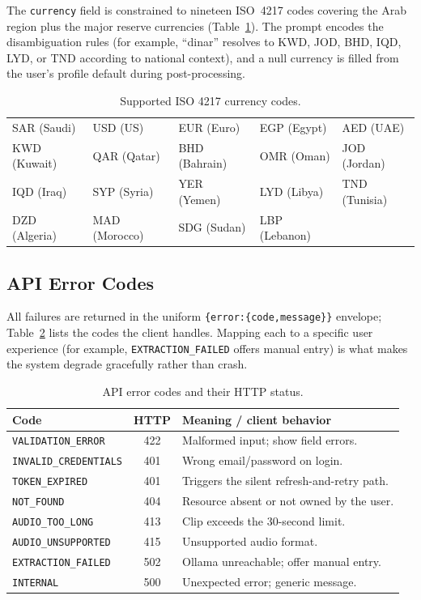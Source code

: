 The \texttt{currency} field is constrained to nineteen ISO~4217 codes covering the
Arab region plus the major reserve currencies (Table~\ref{tab:currencies}). The
prompt encodes the disambiguation rules (for example, ``dinar'' resolves to KWD,
JOD, BHD, IQD, LYD, or TND according to national context), and a null currency is
filled from the user's profile default during post-processing.

\begin{table}[H]
\centering
\caption{Supported ISO 4217 currency codes.}
\label{tab:currencies}
\small
\renewcommand{\arraystretch}{1.15}
\begin{tabularx}{\textwidth}{X X X X X}
\toprule
SAR (Saudi) & USD (US) & EUR (Euro) & EGP (Egypt) & AED (UAE) \\
KWD (Kuwait) & QAR (Qatar) & BHD (Bahrain) & OMR (Oman) & JOD (Jordan) \\
IQD (Iraq) & SYP (Syria) & YER (Yemen) & LYD (Libya) & TND (Tunisia) \\
DZD (Algeria) & MAD (Morocco) & SDG (Sudan) & LBP (Lebanon) & \\
\bottomrule
\end{tabularx}
\end{table}

\subsection{API Error Codes}

All failures are returned in the uniform \texttt{\{error:\{code,message\}\}}
envelope; Table~\ref{tab:errors} lists the codes the client handles. Mapping
each to a specific user experience (for example, \texttt{EXTRACTION\_FAILED}
offers manual entry) is what makes the system degrade gracefully rather than
crash.

\begin{table}[H]
\centering
\caption{API error codes and their HTTP status.}
\label{tab:errors}
\small
\renewcommand{\arraystretch}{1.2}
\begin{tabularx}{\textwidth}{l c X}
\toprule
\textbf{Code} & \textbf{HTTP} & \textbf{Meaning / client behavior} \\
\midrule
\texttt{VALIDATION\_ERROR}   & 422 & Malformed input; show field errors. \\
\texttt{INVALID\_CREDENTIALS}& 401 & Wrong email/password on login. \\
\texttt{TOKEN\_EXPIRED}      & 401 & Triggers the silent refresh-and-retry path. \\
\texttt{NOT\_FOUND}          & 404 & Resource absent or not owned by the user. \\
\texttt{AUDIO\_TOO\_LONG}    & 413 & Clip exceeds the 30-second limit. \\
\texttt{AUDIO\_UNSUPPORTED}  & 415 & Unsupported audio format. \\
\texttt{EXTRACTION\_FAILED}  & 502 & Ollama unreachable; offer manual entry. \\
\texttt{INTERNAL}            & 500 & Unexpected error; generic message. \\
\bottomrule
\end{tabularx}
\end{table}

